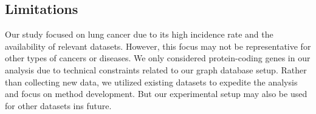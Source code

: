 \subsection{Limitations} \label{subsec:limitations}
Our study focused on lung cancer due to its high incidence rate and the availability of relevant datasets.
However, this focus may not be representative for other types of cancers or diseases.
We only considered protein-coding genes in our analysis due to technical constraints related to our graph database setup.
Rather than collecting new data, we utilized existing datasets to expedite the analysis and focus on method development.
But our experimental setup may also be used for other datasets ins future.\\
